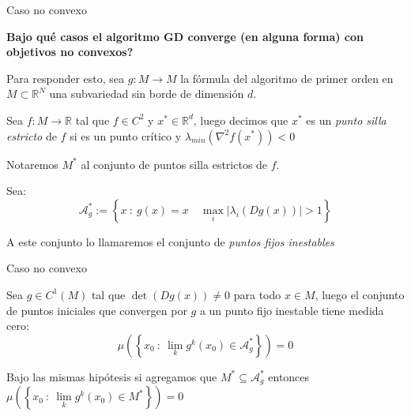 \documentclass{beamer}
\newcommand{\puntosfijos}{\mathcal{A}_{g}^{*}}
\newcommand{\R}{{\mathbb{R}}}
\newcommand{\abs}[1]{\left\lvert#1\right\rvert}
\newcommand{\sett}[1]{\left\lbrace#1\right\rbrace}
\newcommand{\Biglim}[2]{\lim\limits_{#1}{#2}}
\begin{document}
\begin{frame}{Caso no convexo}

\textbf{{Bajo qu\'e casos el algoritmo GD converge (en alguna forma) con objetivos no convexos?}}

\pause

Para responder esto, sea $g : M  \rightarrow M$ la f\'ormula del algoritmo de primer orden en $M \subset \R^N$ una subvariedad sin borde de dimensi\'on $d$.

\begin{definition}
	Sea $f : M \rightarrow \R$ tal que $f \in C^2$ y $x^* \in \R^d$, luego decimos que $x^*$ es un \textit{punto silla estricto} de $f$ si es un punto cr\'itico y $\lambda_{min} \left(\nabla ^2 f(x^*)\right) < 0$ 
	
	Notaremos $M^*$ al conjunto de puntos silla estrictos de $f$.
	
\end{definition}

\pause

\begin{definition}
	Sea:
	\begin{equation*}
	\puntosfijos := \sett{x \ : \ g(x) = x \quad \max\limits_{i}\abs{\lambda_i \left(Dg(x)\right)} > 1}
	\end{equation*}
	
	A este conjunto lo llamaremos el conjunto de \textit{puntos fijos inestables}
\end{definition}



\end{frame}

\begin{frame}{Caso no convexo}

\begin{theorem}
	Sea $g \in C^1(M)$ tal que $\det\left(Dg(x)\right) \neq 0$ para todo $x \in M$, luego el conjunto de puntos iniciales que convergen por $g$ a un punto fijo inestable tiene medida cero:
	\begin{equation*}
	\mu \left(\sett{x_0 \ \colon \ \Biglim{k}{g^k(x_0) \in \mathcal{A}_g^{*}}}\right) = 0
	\end{equation*}
\end{theorem}

\pause

\begin{corollary}
	Bajo las mismas hip\'otesis si agregamos que $M^* \subseteq \mathcal{A}_g^{*}$ entonces $\mu(\sett{x_0 \ \colon \ \Biglim{k}{g^k(x_0) \in M^*}}) =0$
\end{corollary}

\end{frame}
\end{document}
